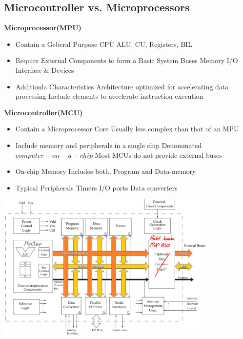 \subsection{Microcontroller vs. Microprocessors}
\vspace{-0.5cm}
\begin{multicols}{2}
    \begin{minipage}{\linewidth}
        \textbf{Microprocessor(MPU)}
       \begin{itemize}
           \item Contain a Geberal Purpose CPU
               \subitem ALU, CU, Registers, BIL %
           \item Require External Components to form a Basic System
               \subitem Buses
               \subitem Memory
               \subitem I/O Interface \& Devices
           \item Additionla Characteristics
               \subitem Architecture optimized for accelerating data processing
               \subitem Include elements to accelerate instruction execution  
        \end{itemize}
    \end{minipage}
    \begin{minipage}{\linewidth}
        \textbf{Microcontroller(MCU)}
        \begin{itemize}
            \item Contain a Microprocessor Core
                \subitem Usually less complex than that of an MPU
            \item Include memory and peripherals in a single chip
                \subitem Denominated $ computer-on-a-chip $ 
                \subitem Most MCUs do not provide external buses
            \item On-chip Memory
                \subitem Includes both, Program and Data-memory
            \item Typical Peripherals
                \subitem Timers
                \subitem I/O ports
                \subitem Data converters
        \end{itemize}     
    \end{minipage}
\end{multicols}
\begin{center}
\includegraphics[width=11cm]{images/mCStructure}
\end{center}
\clearpage

